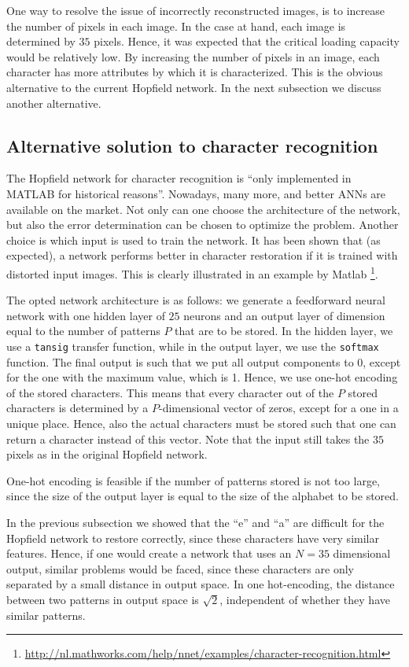 \documentclass[pdftex,12pt,a4paper]{article}
\begin{document}
One way to resolve the issue of incorrectly reconstructed images, is to increase the number of pixels in each  image. In the case at hand, each image is determined by $35$ pixels. Hence, it was expected that the critical loading capacity would be relatively low. By increasing the number of pixels in an image, each character has more attributes by which it is characterized. This is the obvious alternative to the current Hopfield network. In the next subsection we discuss another alternative.

\subsection{Alternative solution to character recognition}
The Hopfield network for character recognition is ``only implemented in MATLAB for historical reasons''. Nowadays, many more, and better ANNs are available on the market. Not only can one choose the architecture of the network, but also the error determination can be chosen to optimize the problem. Another choice is which input is used to train the network. It has been shown that (as expected), a network performs better in character restoration if it is trained with distorted input images. This is clearly illustrated in an example by Matlab \footnote{\url{http://nl.mathworks.com/help/nnet/examples/character-recognition.html}}.

The opted network architecture is as follows: we generate a feedforward neural network with one hidden layer of $25$ neurons and an output layer of dimension equal to the number of patterns $P$ that are to be stored. In the hidden layer, we use a \texttt{tansig} transfer function, while in the output layer, we use the \texttt{softmax} function. The final output is such that we put all output components to 0, except for the one with the maximum value, which is 1. Hence, we use one-hot encoding of the stored characters. This means that every character out of the $P$ stored characters is determined by a $P$-dimensional vector of zeros, except for a one in a unique place. Hence, also the actual characters must be stored such that one can return a character instead of this vector.  Note that the input still takes the $35$ pixels as in the original Hopfield network.

One-hot encoding is feasible if the number of patterns stored is not too large, since the size of the output layer is equal to the size of the alphabet to be stored.

In the previous subsection we showed that the ``e'' and ``a'' are difficult for the Hopfield network to restore correctly, since these characters have very similar features. Hence, if one would create a network that uses an $N=35$ dimensional output, similar problems would be faced, since these characters are only separated by a small distance in output space. In one hot-encoding, the distance between two patterns in output space is $\sqrt{2}$, independent of whether they have similar patterns.
\end{document}
